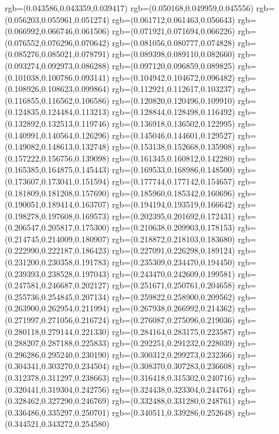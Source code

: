 {{{			rgb=(0.043586,0.043359,0.039417)
			rgb=(0.050168,0.049959,0.045556)
			rgb=(0.056203,0.055961,0.051274)
			rgb=(0.061712,0.061463,0.056643)
			rgb=(0.066992,0.066746,0.061506)
			rgb=(0.071921,0.071694,0.066226)
			rgb=(0.076552,0.076296,0.070642)
			rgb=(0.081056,0.080777,0.074828)
			rgb=(0.085276,0.085021,0.078791)
			rgb=(0.089398,0.089110,0.082660)
			rgb=(0.093274,0.092973,0.086288)
			rgb=(0.097120,0.096859,0.089825)
			rgb=(0.101038,0.100786,0.093141)
			rgb=(0.104942,0.104672,0.096482)
			rgb=(0.108926,0.108623,0.099864)
			rgb=(0.112921,0.112617,0.103237)
			rgb=(0.116855,0.116562,0.106586)
			rgb=(0.120820,0.120496,0.109910)
			rgb=(0.124835,0.124484,0.113213)
			rgb=(0.128844,0.128498,0.116492)
			rgb=(0.132892,0.132513,0.119746)
			rgb=(0.136918,0.136502,0.122995)
			rgb=(0.140991,0.140564,0.126296)
			rgb=(0.145046,0.144601,0.129527)
			rgb=(0.149082,0.148613,0.132748)
			rgb=(0.153138,0.152668,0.135908)
			rgb=(0.157222,0.156756,0.139098)
			rgb=(0.161345,0.160812,0.142280)
			rgb=(0.165385,0.164875,0.145443)
			rgb=(0.169533,0.168986,0.148500)
			rgb=(0.173607,0.173041,0.151594)
			rgb=(0.177744,0.177142,0.154657)
			rgb=(0.181809,0.181208,0.157690)
			rgb=(0.185960,0.185342,0.160696)
			rgb=(0.190051,0.189414,0.163707)
			rgb=(0.194194,0.193519,0.166642)
			rgb=(0.198278,0.197608,0.169573)
			rgb=(0.202395,0.201692,0.172431)
			rgb=(0.206547,0.205817,0.175300)
			rgb=(0.210638,0.209903,0.178153)
			rgb=(0.214745,0.214009,0.180907)
			rgb=(0.218872,0.218103,0.183680)
			rgb=(0.222990,0.222187,0.186423)
			rgb=(0.227091,0.226298,0.189124)
			rgb=(0.231200,0.230358,0.191783)
			rgb=(0.235309,0.234470,0.194450)
			rgb=(0.239393,0.238528,0.197043)
			rgb=(0.243470,0.242609,0.199581)
			rgb=(0.247581,0.246687,0.202127)
			rgb=(0.251671,0.250761,0.204658)
			rgb=(0.255736,0.254845,0.207134)
			rgb=(0.259822,0.258900,0.209562)
			rgb=(0.263900,0.262954,0.211994)
			rgb=(0.267938,0.266992,0.214362)
			rgb=(0.271997,0.271056,0.216724)
			rgb=(0.276087,0.275096,0.219036)
			rgb=(0.280118,0.279144,0.221330)
			rgb=(0.284164,0.283175,0.223587)
			rgb=(0.288207,0.287188,0.225833)
			rgb=(0.292251,0.291232,0.228039)
			rgb=(0.296286,0.295240,0.230190)
			rgb=(0.300312,0.299273,0.232366)
			rgb=(0.304341,0.303270,0.234504)
			rgb=(0.308370,0.307283,0.236608)
			rgb=(0.312378,0.311297,0.238663)
			rgb=(0.316418,0.315302,0.240716)
			rgb=(0.320441,0.319304,0.242756)
			rgb=(0.324438,0.323304,0.244764)
			rgb=(0.328462,0.327290,0.246769)
			rgb=(0.332488,0.331280,0.248761)
			rgb=(0.336486,0.335297,0.250701)
			rgb=(0.340511,0.339286,0.252648)
			rgb=(0.344521,0.343272,0.254580)
}}}
